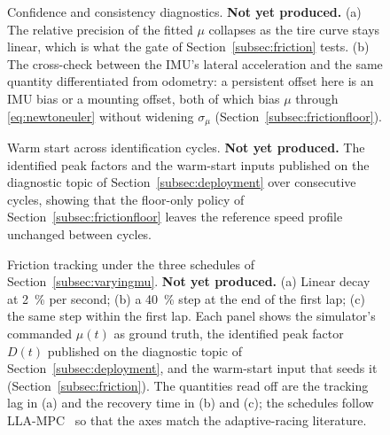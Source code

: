 \begin{figure}[t]
\centering
{}
\caption{Confidence and consistency diagnostics. \textbf{Not yet produced.}
(a) The relative precision of the fitted $\mu$ collapses as the tire curve
stays linear, which is what the gate of Section~\ref{subsec:friction} tests.
(b) The cross-check between the IMU's lateral acceleration and the same
quantity differentiated from odometry: a persistent offset here is an IMU bias
or a mounting offset, both of which bias $\mu$ through
\eqref{eq:newtoneuler} without widening $\sigma_{\mu}$
(Section~\ref{subsec:frictionfloor}).}
\label{fig:mucrosscheck}
\end{figure}

\begin{figure}[t]
\centering
{}
\caption{Warm start across identification cycles. \textbf{Not yet produced.}
The identified peak factors and the warm-start inputs published on the
diagnostic topic of Section~\ref{subsec:deployment} over consecutive cycles,
showing that the floor-only policy of Section~\ref{subsec:frictionfloor} leaves
the reference speed profile unchanged between cycles.}
\label{fig:mucycles}
\end{figure}


\begin{figure}[t]
\centering
{}
\caption{Friction tracking under the three schedules of
Section~\ref{subsec:varyingmu}. \textbf{Not yet produced.} (a) Linear decay at
\SI{2}{\percent} per second; (b) a \SI{40}{\percent} step at the end of the
first lap; (c) the same step within the first lap. Each panel shows the
simulator's commanded $\mu(t)$ as ground truth, the identified peak factor
$D(t)$ published on the diagnostic topic of
Section~\ref{subsec:deployment}, and the warm-start input that seeds it
(Section~\ref{subsec:friction}). The quantities read off are the tracking lag
in (a) and the recovery time in (b) and (c); the schedules follow
LLA-MPC~\cite{llampc2025} so that the axes match the adaptive-racing
literature.}
\label{fig:mutracking}
\end{figure}


